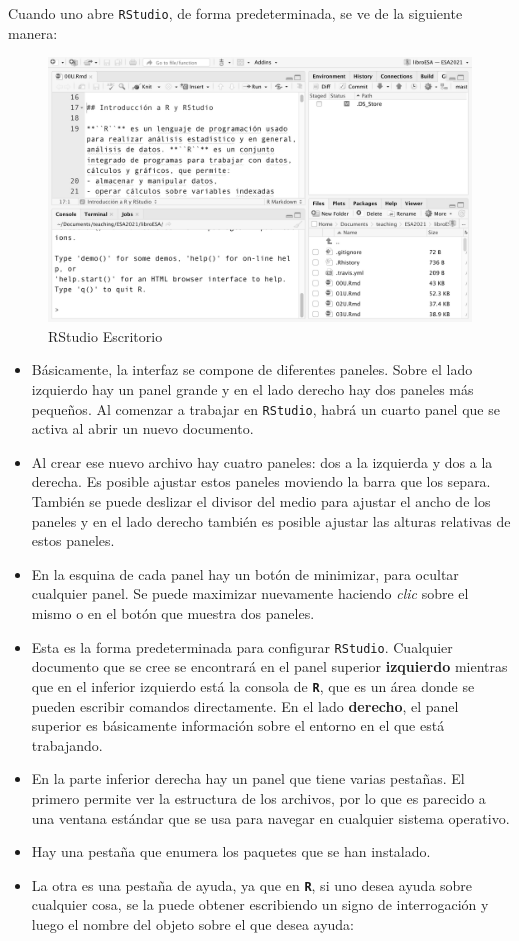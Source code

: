 \documentclass[
]{article}
\begin{document}
Cuando uno abre \texttt{RStudio}, de forma predeterminada, se ve de la siguiente manera:

\begin{figure}

{\centering \includegraphics[width=0.8\linewidth]{imagenes_byn/rstudio_entorno} 

}

\caption{RStudio Escritorio}\label{fig:unnamed-chunk-144}
\end{figure}

\begin{itemize}
\item
  Básicamente, la interfaz se compone de diferentes paneles. Sobre el lado izquierdo hay un panel grande y en el lado derecho hay dos paneles más pequeños. Al comenzar a trabajar en \texttt{RStudio}, habrá un cuarto panel que se activa al abrir un nuevo documento.
\item
  Al crear ese nuevo archivo hay cuatro paneles: dos a la izquierda y dos a la derecha. Es posible ajustar estos paneles moviendo la barra que los separa. También se puede deslizar el divisor del medio para ajustar el ancho de los paneles y en el lado derecho también es posible ajustar las alturas relativas de estos paneles.
\item
  En la esquina de cada panel hay un botón de minimizar, para ocultar cualquier panel. Se puede maximizar nuevamente haciendo \emph{clic} sobre el mismo o en el botón que muestra dos paneles.
\item
  Esta es la forma predeterminada para configurar \texttt{RStudio}. Cualquier documento que se cree se encontrará en el panel superior \textbf{izquierdo} mientras que en el inferior izquierdo está la consola de \textbf{\texttt{R}}, que es un área donde se pueden escribir comandos directamente. En el lado \textbf{derecho}, el panel superior es básicamente información sobre el entorno en el que está trabajando.
\item
  En la parte inferior derecha hay un panel que tiene varias pestañas. El primero permite ver la estructura de los archivos, por lo que es parecido a una ventana estándar que se usa para navegar en cualquier sistema operativo.
\item
  Hay una pestaña que enumera los paquetes que se han instalado.
\item
  La otra es una pestaña de ayuda, ya que en \textbf{\texttt{R}}, si uno desea ayuda sobre cualquier cosa, se la puede obtener escribiendo un signo de interrogación y luego el nombre del objeto sobre el que desea ayuda:
\end{itemize}
\end{document}
